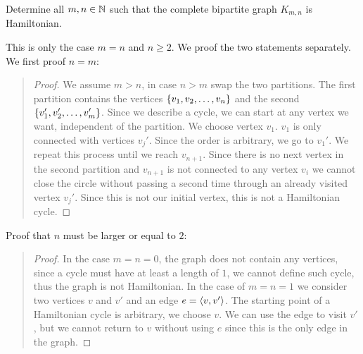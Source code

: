 \documentclass{article}
\begin{document}
\begin{exercise}
Determine all $m,n\in\mathbb{N}$ such that the complete bipartite graph $K_{m,n}$ is Hamiltonian.
\begin{answer}
This is only the case $m=n$ and $n\geq 2$. We proof the two statements separately. We first proof $n=m$:
\begin{quote}\begin{proof}
We assume $m>n$, in case $n>m$ swap the two partitions. The first partition contains the vertices $\left\{ v_1,v_2,\ldots,v_n \right\}$ and the second $\left\{ v_1',v_2',\ldots,v_m' \right\}$. Since we describe a cycle, we can start at any vertex we want, independent of the partition. We choose vertex $v_1$. $v_1$ is only connected with vertices $v_j'$. Since the order is arbitrary, we go to $v_1'$. We repeat this process until we reach $v_{n+1}$. Since there is no next vertex in the second partition and $v_{n+1}$ is not connected to any vertex $v_i$ we cannot close the circle without passing a second time through an already visited vertex $v_j'$. Since this is not our initial vertex, this is not a Hamiltonian cycle.
\end{proof}\end{quote}
Proof that $n$ must be larger or equal to $2$:
\begin{quote}\begin{proof}
In the case $m=n=0$, the graph does not contain any vertices, since a cycle must have at least a length of $1$, we cannot define such cycle, thus the graph is not Hamiltonian. In the case of $m=n=1$ we consider two vertices $v$ and $v'$ and an edge $e=\left\langle v,v' \right\rangle$. The starting point of a Hamiltonian cycle is arbitrary, we choose $v$. We can use the edge to visit $v'$, but we cannot return to $v$ without using $e$ since this is the only edge in the graph.
\end{proof}\end{quote}
\end{answer}
\end{exercise}
\end{document}
